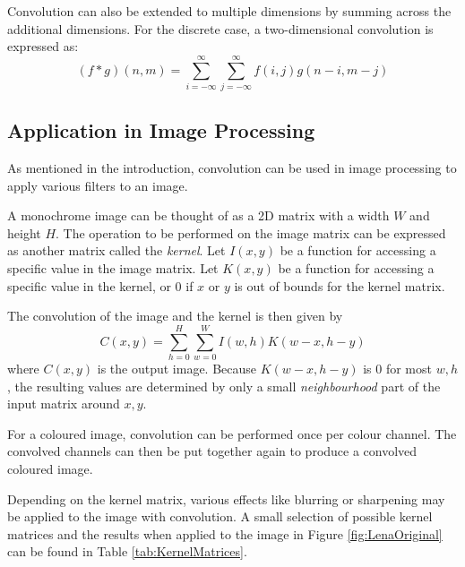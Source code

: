 Convolution can also be extended to multiple dimensions by summing across the additional dimensions.
For the discrete case, a two-dimensional convolution is expressed as:
\[
    (f * g)(n, m) = \sum^{\infty}_{i=-\infty}\sum^{\infty}_{j=-\infty}{f(i, j)g(n-i, m-j)}
\]

\subsection{Application in Image Processing}
As mentioned in the introduction, convolution can be used in image processing to apply various filters to an image.

A monochrome image can be thought of as a 2D matrix with a width $W$ and height $H$.
The operation to be performed on the image matrix can be expressed as another matrix called the \textit{kernel}.
Let $I(x, y)$ be a function for accessing a specific value in the image matrix.
Let $K(x, y)$ be a function for accessing a specific value in the kernel,
or $0$ if $x$ or $y$ is out of bounds for the kernel matrix.

The convolution of the image and the kernel is then given by
\[
    C(x, y) = \sum^{H}_{h=0} \sum^{W}_{w=0}{I(w, h)K(w - x, h - y)}
\]
where $C(x, y)$ is the output image.
Because $K(w - x, h - y)$ is $0$ for most $w, h$, the resulting values are determined by only a small \textit{neighbourhood} part of the input matrix around $x, y$.

For a coloured image, convolution can be performed once per colour channel. The convolved channels can then be put together again to produce a convolved coloured image.

Depending on the kernel matrix, various effects like blurring or sharpening may be applied to the image with convolution.
A small selection of possible kernel matrices and the results when applied to the image in Figure \ref{fig:LenaOriginal} can be found in Table \ref{tab:KernelMatrices}.

